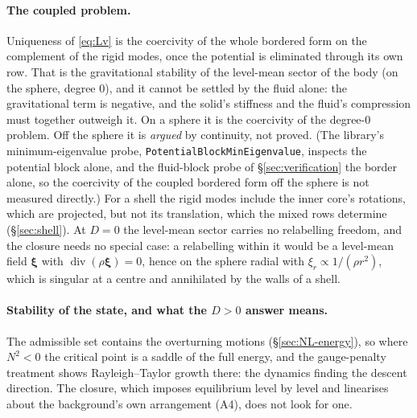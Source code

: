 \documentclass[11pt]{article}
\theoremstyle{definition}
\theoremstyle{remark}
\newcommand{\bxi}{\boldsymbol{\xi}}
\newcommand{\Div}{\operatorname{div}}
\newcommand{\code}[1]{\texttt{#1}}
\begin{document}
\paragraph{The coupled problem.} Uniqueness of \eqref{eq:Lv} is the
coercivity of the whole bordered form on the complement of the rigid
modes, once the potential is eliminated through its own row. That is
the gravitational stability of the level-mean sector of the body (on
the sphere, degree $0$), and it cannot be settled by the fluid alone:
the gravitational term is negative, and the solid's stiffness and the
fluid's compression must together outweigh it. On a sphere it is the
coercivity of the degree-0 problem. Off the sphere it is
\emph{argued} by continuity, not proved. (The library's
minimum-eigenvalue probe, \code{PotentialBlockMinEigenvalue}, inspects the
potential block alone, and the fluid-block probe of
\S\ref{sec:verification} the border alone, so the coercivity of the
coupled bordered form off the sphere is not measured directly.) For a
shell the rigid modes include the inner core's rotations, which are
projected, but not its translation, which the mixed rows determine
(\S\ref{sec:shell}). At $D = 0$ the level-mean sector carries no
relabelling freedom, and the closure needs no special case: a
relabelling within it would be a level-mean field $\bxi$ with
$\Div(\rho\bxi) = 0$, hence on the sphere radial with $\xi_r \propto
1/(\rho r^2)$, which is singular at a centre and annihilated by the
walls of a shell.

\paragraph{Stability of the state, and what the $D > 0$ answer means.}
The admissible set contains the overturning motions
(\S\ref{sec:NL-energy}), so where $N^2 < 0$ the critical point is a
saddle of the full energy, and the gauge-penalty treatment shows
Rayleigh--Taylor growth there: the dynamics finding the descent
direction. The closure, which imposes equilibrium level by level and
linearises about the background's own arrangement (A4), does not look
for one.
\end{document}
